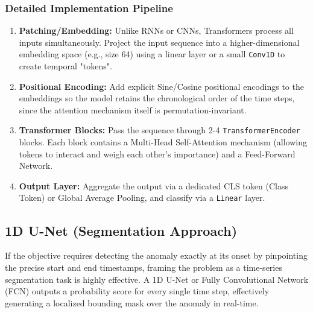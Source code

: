 \subsubsection*{Detailed Implementation Pipeline}
\begin{enumerate}
    \item \textbf{Patching/Embedding:} Unlike RNNs or CNNs, Transformers process all inputs simultaneously. Project the input sequence into a higher-dimensional embedding space (e.g., size 64) using a linear layer or a small \texttt{Conv1D} to create temporal "tokens".
    \item \textbf{Positional Encoding:} Add explicit Sine/Cosine positional encodings to the embeddings so the model retains the chronological order of the time steps, since the attention mechanism itself is permutation-invariant.
    \item \textbf{Transformer Blocks:} Pass the sequence through 2-4 \texttt{TransformerEncoder} blocks. Each block contains a Multi-Head Self-Attention mechanism (allowing tokens to interact and weigh each other's importance) and a Feed-Forward Network.
    \item \textbf{Output Layer:} Aggregate the output via a dedicated CLS token (Class Token) or Global Average Pooling, and classify via a \texttt{Linear} layer.
\end{enumerate}

\subsection{1D U-Net (Segmentation Approach)}
If the objective requires detecting the anomaly exactly at its onset by pinpointing the precise start and end timestamps, framing the problem as a time-series segmentation task is highly effective. A 1D U-Net or Fully Convolutional Network (FCN) outputs a probability score for every single time step, effectively generating a localized bounding mask over the anomaly in real-time.

